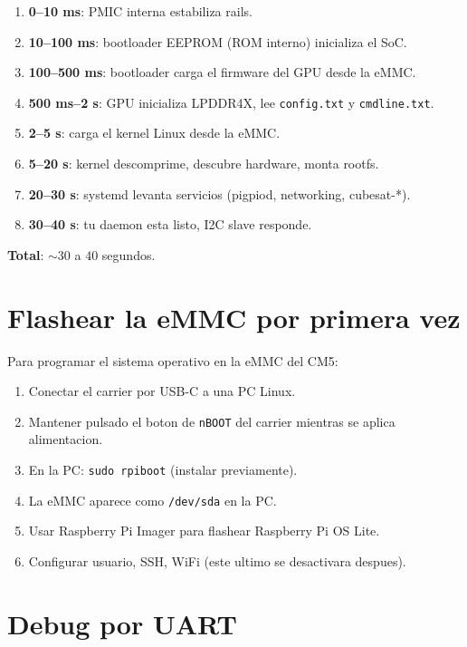 \documentclass[11pt,a4paper,oneside,openright]{book}
\begin{document}
\begin{enumerate}[leftmargin=2em]
  \item \textbf{0--10 ms}: PMIC interna estabiliza rails.
  \item \textbf{10--100 ms}: bootloader EEPROM (ROM interno) inicializa
        el SoC.
  \item \textbf{100--500 ms}: bootloader carga el firmware del GPU desde
        la eMMC.
  \item \textbf{500 ms--2 s}: GPU inicializa LPDDR4X, lee \texttt{config.txt}
        y \texttt{cmdline.txt}.
  \item \textbf{2--5 s}: carga el kernel Linux desde la eMMC.
  \item \textbf{5--20 s}: kernel descomprime, descubre hardware, monta
        rootfs.
  \item \textbf{20--30 s}: systemd levanta servicios (pigpiod, networking,
        cubesat-*).
  \item \textbf{30--40 s}: tu daemon esta listo, I2C slave responde.
\end{enumerate}

\textbf{Total}: $\sim 30$ a $40$ segundos.

\section{Flashear la eMMC por primera vez}

Para programar el sistema operativo en la eMMC del CM5:

\begin{enumerate}[leftmargin=2em]
  \item Conectar el carrier por USB-C a una PC Linux.
  \item Mantener pulsado el boton de \texttt{nBOOT} del carrier mientras
        se aplica alimentacion.
  \item En la PC: \texttt{sudo rpiboot} (instalar previamente).
  \item La eMMC aparece como \texttt{/dev/sda} en la PC.
  \item Usar Raspberry Pi Imager para flashear Raspberry Pi OS Lite.
  \item Configurar usuario, SSH, WiFi (este ultimo se desactivara despues).
\end{enumerate}

\section{Debug por UART}
\end{document}
